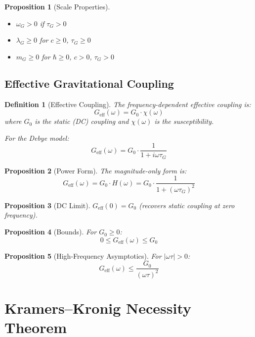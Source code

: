 \documentclass[11pt]{article}
\newtheorem{definition}{Definition}
\newtheorem{proposition}{Proposition}
\begin{document}
\begin{proposition}[Scale Properties]
\begin{itemize}
\item $\omega_G > 0$ if $\tau_G > 0$
\item $\lambda_G \geq 0$ for $c \geq 0$, $\tau_G \geq 0$
\item $m_G \geq 0$ for $\hbar \geq 0$, $c > 0$, $\tau_G > 0$
\end{itemize}
\end{proposition}

\subsection{Effective Gravitational Coupling}

\begin{definition}[Effective Coupling]
The frequency-dependent effective coupling is:
\[
G_{\text{eff}}(\omega) = G_0 \cdot \chi(\omega)
\]
where $G_0$ is the static (DC) coupling and $\chi(\omega)$ is the susceptibility.

For the Debye model:
\[
G_{\text{eff}}(\omega) = G_0 \cdot \frac{1}{1 + i\omega\tau_G}
\]
\end{definition}

\begin{proposition}[Power Form]
The magnitude-only form is:
\[
G_{\text{eff}}(\omega) = G_0 \cdot H(\omega) = G_0 \cdot \frac{1}{1 + (\omega\tau_G)^2}
\]
\end{proposition}

\begin{proposition}[DC Limit]
$G_{\text{eff}}(0) = G_0$ (recovers static coupling at zero frequency).
\end{proposition}

\begin{proposition}[Bounds]
For $G_0 \geq 0$:
\[
0 \leq G_{\text{eff}}(\omega) \leq G_0
\]
\end{proposition}

\begin{proposition}[High-Frequency Asymptotics]
For $|\omega\tau| > 0$:
\[
G_{\text{eff}}(\omega) \leq \frac{G_0}{(\omega\tau)^2}
\]
\end{proposition}

\section{Kramers--Kronig Necessity Theorem}
\end{document}
